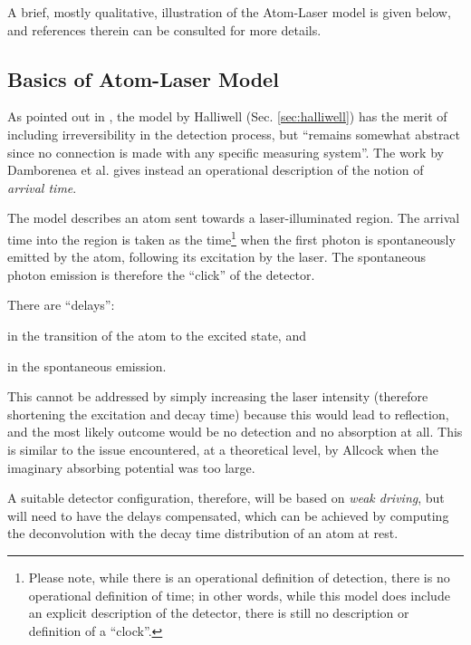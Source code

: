 A brief, mostly qualitative, illustration of the Atom-Laser model is
given below, and references therein can be consulted for more details.

\subsection{Basics of Atom-Laser Model}\label{sec:detect:atomlaser}

As pointed out in \cite{Damborenea}, the model by Halliwell (Sec. \ref{sec:halliwell})
has the merit of including irreversibility in the detection process,
but ``remains somewhat abstract
since no connection is made with any specific measuring
system''. The work by Damborenea et al. gives instead an operational
description of the notion of \emph{arrival time}.

The model describes an atom sent towards a laser-illuminated region.
The arrival time into the region is taken as the time\footnote{
  Please note, while there is an operational definition of detection,
  there is no operational definition of time; in other words,
  while this model does include an explicit description of the detector,
  there is still no description or definition of a ``clock''.
}
when the first photon is spontaneously emitted by the atom,
following its excitation by the laser.
The spontaneous photon emission is therefore the ``click'' of the detector.


There are ``delays'':
\begin{enumerate*}[label=\arabic*)]
  \item in the transition of the atom to the excited state, and
  \item in the spontaneous emission.
\end{enumerate*}
This cannot be addressed by simply increasing the laser intensity
(therefore shortening the excitation and decay time)
because this would lead to %
reflection,
and the most likely outcome would be no detection and no absorption at all.
This is similar to the issue encountered, at a theoretical level,
by Allcock when the imaginary absorbing potential was too large.

A suitable detector configuration, therefore, will be based on \emph{weak driving},
but will need to have the delays compensated,
which can be achieved
by computing the
deconvolution with the decay time distribution of an atom at rest.

